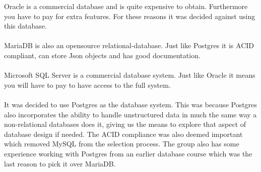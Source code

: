 Oracle is a commercial database and is quite expensive to obtain\cite{oracle}.
Furthermore you have to pay for extra features.
For these reasons it was decided against using this database.
\\
\\
MariaDB is also an opensource relational-database\cite{MariaDB}.
Just like Postgres it is ACID compliant, can store Json objects and has good documentation.
\\
\\
Microsoft SQL Server is a commercial database system\cite{MSSQLSERVER}.
Just like Oracle it means you will have to pay to have access to the full system.
\\
\\
It was decided to use Postgres as the database system.
This was because Postgres also incorporates the ability to handle unstructured data in much the same way a non-relational databases does it, giving us the means to explore that aspect of database design if needed.
The ACID compliance was also deemed important which removed MySQL from the selection process. 
The group also has some experience working with Postgres from an earlier database course which was the last reason to pick it over MariaDB.
